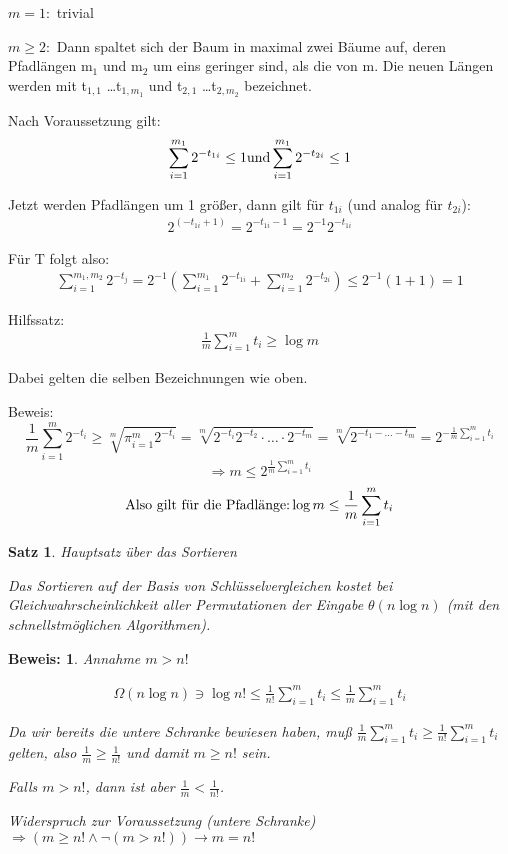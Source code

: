 \documentclass[ngerman,draft,parskip=half*,twoside]{scrreprt}
\theoremstyle{break}
\newtheorem{satz}{Satz}[chapter]
\theoremstyle{nonumberbreak}
\newtheorem{beweis}{Beweis:}
\begin{document}
$m = 1:$ trivial


$m \geq 2:$ Dann spaltet sich der Baum in maximal zwei Bäume auf, deren Pfadlängen m$_1$ und m$_2$ um eins geringer sind, als die
von m. Die neuen Längen werden mit t$_{1,1}$ \ldots t$_{1,m_1}$ und t$_{2,1}$ \ldots t$_{2,m_2}$ bezeichnet.


Nach Voraussetzung gilt:
\begin{gather*}
\sum_{i=1}^{m_{1}} 2^{-t_{1i}}\leq 1\textup{und}  \sum_{i=1}^{m_{1}} 2^{-t_{2i}}\leq 1
\end{gather*}

Jetzt werden Pfadlängen um 1 größer, dann gilt für $t_{1i}$ (und analog für $t_{2i}$):
\begin{gather*}
2^{(-t_{1i}+1)}=2^{-t_{1i}-1}=2^{-1} 2^{-t_{1i}}
\end{gather*}

Für T folgt also:
\begin{gather*}
\sum_{i=1}^{m_1,  m_2} 2^{-t_{j}}=2^{-1}\left(\sum_{i=1}^{m_{1}} 2^{-t_{1i}}+\sum_{i=1}^{m_{2}} 2^{-t_{2i}}\right)
\leq 2^{-1}(1+1)=1
\end{gather*}

Hilfssatz:
\begin{gather*}
\frac{1}{m}  \sum_{i=1}^{m}t_{i}\geq \log m
\end{gather*}

Dabei gelten die selben Bezeichnungen wie oben.

Beweis:
\[
\frac{1}{m}   \sum_{i=1}^{m}2^{-t_{i}} \geq \sqrt[m]{\pi_{i=1}^{m}2^{-t_{i}}}=\sqrt[m]{2^{-t_i}  2^{-t_2}\cdot \ldots \cdot 2^{-t_m}}
=\sqrt[m]{2^{-t_1-  \ldots   -t_m}}= 2^{-\frac{1}{m}\sum_{i=1}^{m}t_i}
\]
\[
\Rightarrow m \leq 2^{\frac{1}{m}  \sum_{i=1}^{m}t_i}
\]
\[
\textup{Also gilt für die Pfadlänge:}\log m \leq\frac{1}{m}  \sum_{i=1}^{m}t_i
\]

\begin{satz}
Hauptsatz über das Sortieren

Das Sortieren auf der Basis von Schlüsselvergleichen kostet bei Gleichwahrscheinlichkeit aller Permutationen der Eingabe
$\theta (n\log n)$ (mit den schnellstmöglichen Algorithmen).
\end{satz}

\begin{beweis}
Annahme $m>n!$

\begin{gather*}
\Omega(n  \log n) \ni \log n!\leq\frac{1}{n!}  \sum_{i=1}^{m}t_i \leq\frac{1}{m}  \sum_{i=1}^{m}t_i
\end{gather*}

Da wir bereits die untere Schranke bewiesen haben, muß $\frac{1}{m}  \sum_{i=1}^{m}t_i \geq \frac{1}{n!}  \sum_{i=1}^{m}t_i$ gelten,
also $\frac{1}{m} \geq \frac{1}{n!}$ und damit $m \geq n!$ sein.

Falls $m>n!$, dann ist aber $\frac{1}{m} < \frac{1}{n!}$.

Widerspruch zur Voraussetzung (untere Schranke) $\Rightarrow (m \geq n! \wedge \lnot (m>n!)) \rightarrow m=n!$
\end{beweis}
\end{document}
